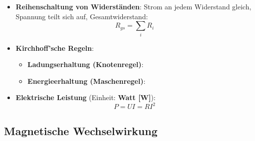 \begin{itemize}
\begin{equation}
	\end{equation}
	\item \textbf{Reihenschaltung von Widerständen}: Strom an jedem Widerstand gleich, Spannung teilt sich auf, Gesamtwiderstand:
	\begin{equation}
		R_{gs} = \sum_i R_i
	\end{equation}
	\item \textbf{Kirchhoff'sche Regeln}:
	\begin{itemize}
		\item \textbf{Ladungserhaltung (Knotenregel)}: 
		\item \textbf{Energieerhaltung (Maschenregel)}: 
	\end{itemize}
	\item \textbf{Elektrische Leistung} (Einheit: \textbf{Watt [W]}):
	\begin{equation}
		P = U I = R I^2
	\end{equation}
\end{itemize}

\newpage
\subsection{Magnetische Wechselwirkung}%
\label{edyn:sub:magnetische_wechselwirkung}

